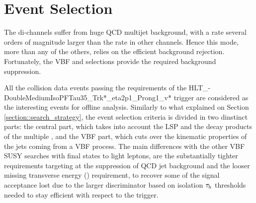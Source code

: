 
\clearpage

\section{Event Selection}

The di-\hadtau channels suffer from huge QCD multijet background, with a rate several orders of magnitude larger than the rate in other channels.  Hence this mode, more than any of the others, relies on the efficient background rejection. Fortunately, the VBF and \met selections provide the required background suppression.

All the collision data events passing the requirements of the
HLT\_-DoubleMediumIsoPFTau35\_Trk*\_eta2p1\_Prong1\_v*
trigger are considered as the interesting events 
for offline analysis.
Similarly to what explained on Section \ref{section::search_strategy}, the event selection criteria is divided in two dinstinct parts: the central part, which takes into account the LSP and the decay products of the multiple \hadtau, and the VBF part, which cuts over the kinematic properties of the jets coming from a VBF process.
The main differences with the other VBF SUSY searches with final states to light leptons, are the substantially tighter \hadtau requirements targeting at the suppression of QCD jet background and the looser missing transverse energy (\met) requirement, to recover some of the signal acceptance lost due to the larger discriminator based on isolation
$\tau_{\text{h}}$ \pt thresholds needed to stay efficient with respect to the trigger.  

